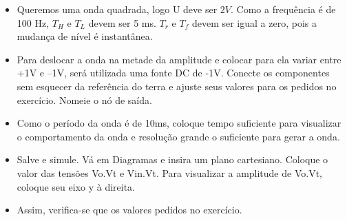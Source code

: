\begin{itemize}
    \item Queremos uma onda quadrada, logo U deve ser $2V$.
    Como a frequência é de 100 Hz, $T_H$ e $T_L$ devem ser 5
    ms. $T_r$ e $T_f$ devem ser igual a zero, pois a mudança de
    nível é instantânea.
\end{itemize}


\begin{itemize}
    \item Para deslocar a onda na metade da amplitude e
    colocar para ela variar entre +1V e –1V, será utilizada
    uma fonte DC de -1V. Conecte os componentes sem
    esquecer da referência do terra e ajuste seus valores
    para os pedidos no exercício. Nomeie o nó de saída.
\end{itemize}


\begin{itemize}
    \item Como o período da onda é de 10ms, coloque tempo
    suficiente para visualizar o comportamento da onda
    e resolução grande o suficiente para gerar a onda.
\end{itemize}


\begin{itemize}
    \item Salve e simule. Vá em Diagramas e insira um plano
    cartesiano. Coloque o valor das tensões Vo.Vt e
    Vin.Vt. Para visualizar a amplitude de Vo.Vt, coloque
    seu eixo y à direita.
\end{itemize}




\begin{itemize}
    \item Assim, verifica-se que os valores pedidos no exercício.
\end{itemize}


